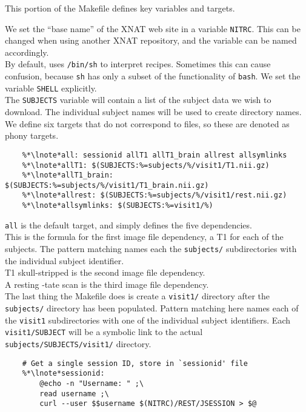 This portion of the Makefile defines key variables and targets. 

\indent {}We set the ``base name'' of the XNAT web site in a variable \texttt{NITRC}. This can be changed when using another XNAT repository, and the variable can be named accordingly. \\
\indent {} By default, \maken{} uses \texttt{/bin/sh} to interpret recipes. Sometimes this can cause confusion, because \texttt{sh} has only a subset of the functionality of \texttt{bash}. We set the \maken{} variable \texttt{SHELL} explicitly. \\
\indent {}The \texttt{SUBJECTS} variable will contain a list of the subject data we wish to download. The individual subject names will be used to create directory names. \\
\indent {}We define six targets that do not correspond to files, so these are denoted as phony targets.

\begin{lstlisting}
	%*\lnote*all: sessionid allT1 allT1_brain allrest allsymlinks
	%*\lnote*allT1: $(SUBJECTS:%=subjects/%/visit1/T1.nii.gz)
	%*\lnote*allT1_brain: $(SUBJECTS:%=subjects/%/visit1/T1_brain.nii.gz)
	%*\lnote*allrest: $(SUBJECTS:%=subjects/%/visit1/rest.nii.gz)
	%*\lnote*allsymlinks: $(SUBJECTS:%=visit1/%)
\end{lstlisting}

\indent {} \texttt{all} is the default target, and simply defines the five dependencies. \\
\indent {} This is the formula for the first image file dependency, a T1 for each of the subjects. The pattern matching names each the \texttt{subjects/} subdirectories with the individual subject identifier. \\
\indent {} T1 skull-stripped is the second image file dependency. \\
\indent {} A resting -tate scan is the third image file dependency. \\
\indent {} The last thing the Makefile does is create a \texttt{visit1/} directory after the \texttt{subjects/} directory has been populated. Pattern matching here names each of the \texttt{visit1} subdirectories with one of the individual subject identifiers. Each \texttt{visit1/SUBJECT} will be a symbolic link to the actual \texttt{subjects/SUBJECTS/visit1/} directory.


\begin{lstlisting}
	# Get a single session ID, store in `sessionid' file
	%*\lnote*sessionid: 
		@echo -n "Username: " ;\
		read username ;\
		curl --user $$username $(NITRC)/REST/JSESSION > $@
\end{lstlisting}

